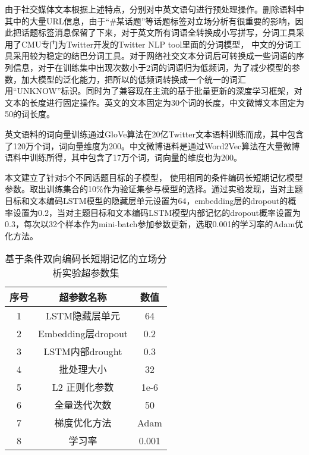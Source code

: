 由于社交媒体文本根据上述特点，分别对中英文语句进行预处理操作。删除语料中其中的大量URL信息，由于“\#某话题”等话题标签对立场分析有很重要的影响，因此把话题标签消息保留了下来，对于英文所有词语全转换成小写拼写，分词工具采用了CMU专门为Twitter开发的Twitter NLP tool里面的分词模型\cite{gimpel2011part}， 中文的分词工具采用较为稳定的结巴分词工具。对于网络社交文本分词后可转换成一些词语的序列信息，对于在训练集中出现次数小于2词的词语归为低频词，为了减少模型的参数，加大模型的泛化能力，把所以的低频词转换成一个统一的词汇用“UNKNOW”标识。同时为了兼容现在主流的基于批量更新的深度学习框架，对文本的长度进行固定操作。英文的文本固定为30个词的长度，中文微博文本固定为50的词长度。

英文语料的词向量训练通过GloVe算法在20亿Twitter文本语料训练而成，其中包含了120万个词，词向量维度为200。中文微博语料是通过Word2Vec算法在大量微博语料中训练所得，其中包含了17万个词，词向量的维度也为200。

本文建立了针对5个不同话题目标的子模型， 使用相同的条件编码长短期记忆模型参数。取出训练集合的10\%作为验证集参与模型的选择。通过实验发现，当对主题目标和文本编码LSTM模型的隐藏层单元设置为64，embedding层的dropout的概率设置为0.2，当对主题目标和文本编码LSTM模型内部记忆的dropout概率设置为0.3，每次以32个样本作为mini-batch参加参数更新，选取0.001的学习率的Adam优化方法。

\begin{table}[htbp]
	\caption[param]{基于条件双向编码长短期记忆的立场分析实验超参数集}
	\label{param}
	\vspace{0.5em}\centering\wuhao
	\begin{tabular}{ccc}
		\toprule[1.5pt]
		序号& 超参数名称 &数值\\
		\midrule[1pt]
		1 &LSTM隐藏层单元& 64\\
		2 &Embedding层dropout& 0.2\\
		3 &LSTM内部drought& 0.3\\
		4 &批处理大小& 32\\
		5 &L2 正则化参数 &1e-6\\
		6 &全量迭代次数& 50\\
		7 &梯度优化方法& Adam\\
		8 &学习率& 0.001\\
		\bottomrule[1.5pt]
	\end{tabular}
\end{table}

